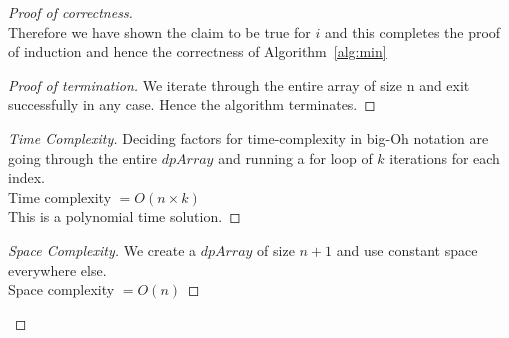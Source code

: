 \begin{solution}{4.2}
\begin{proof}[Proof of correctness]
\begin{equation}
        \end{equation}
        Therefore we have shown the claim to be true for $i$ and this completes the proof of induction and hence the correctness of Algorithm~\ref{alg:min}
        \begin{proof}[Proof of termination]
            We iterate through the entire array of size n and exit successfully in any case. Hence the algorithm terminates.
        \end{proof}
        \begin{proof}[Time Complexity]
        Deciding factors for time-complexity in big-Oh notation are going through the entire $dpArray$ and running a for loop of $k$ iterations for each index.\\
        Time complexity $=O(n\times k)$\\
        This is a polynomial time solution.
        \end{proof}
        \begin{proof}[Space Complexity]
        We create a $dpArray$ of size $n+1$ and use constant space everywhere else.\\
        Space complexity $=O(n)$
        \end{proof}
    \end{proof}
\end{solution}
